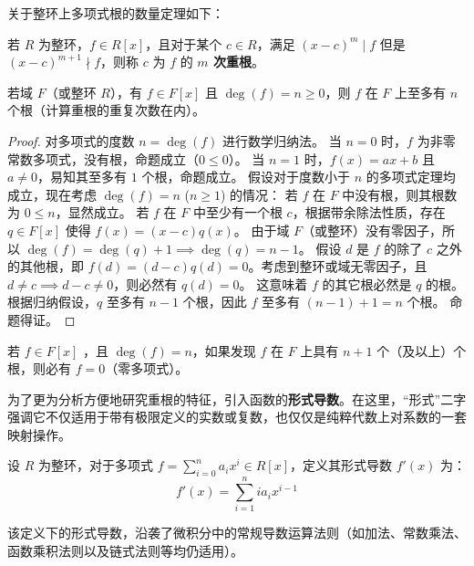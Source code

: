 \documentclass[11pt]{article}
\begin{document}
关于整环上多项式根的数量定理如下：
\begin{cndefinition}[重根]
若 $R$ 为整环，$f \in R[x]$，且对于某个 $c \in R$，满足 $(x-c)^m \mid f$ 但是 $(x-c)^{m+1} \nmid f$，则称 $c$ 为 $f$ 的 \textbf{$m$ 次重根}。
\end{cndefinition}

\begin{cntheorem}[代数基本定理的推论]
若域 $F$（或整环 $R$），有 $f \in F[x]$ 且 $\deg(f) = n \ge 0$，则 $f$ 在 $F$ 上至多有 $n$ 个根（计算重根的重复次数在内）。
\end{cntheorem}
\begin{proof}
对多项式的度数 $n = \deg(f)$ 进行数学归纳法。
当 $n = 0$ 时，$f$ 为非零常数多项式，没有根，命题成立（$0 \le 0$）。
当 $n = 1$ 时，$f(x) = ax+b$ 且 $a \neq 0$，易知其至多有 $1$ 个根，命题成立。
假设对于度数小于 $n$ 的多项式定理均成立，现在考虑 $\deg(f) = n$ ($n \ge 1$) 的情况：
若 $f$ 在 $F$ 中没有根，则其根数为 $0 \le n$，显然成立。
若 $f$ 在 $F$ 中至少有一个根 $c$，根据带余除法性质，存在 $q \in F[x]$ 使得 $f(x) = (x-c)q(x)$。
由于域 $F$（或整环）没有零因子，所以 $\deg(f) = \deg(q) + 1 \implies \deg(q) = n-1$。
假设 $d$ 是 $f$ 的除了 $c$ 之外的其他根，即 $f(d) = (d-c)q(d) = 0$。考虑到整环或域无零因子，且 $d \neq c \implies d-c \neq 0$，则必然有 $q(d) = 0$。
这意味着 $f$ 的其它根必然是 $q$ 的根。根据归纳假设，$q$ 至多有 $n-1$ 个根，因此 $f$ 至多有 $(n-1) + 1 = n$ 个根。
命题得证。
\end{proof}

\begin{cncorollary}
若 $f \in F[x]$ ，且 $\deg(f) = n$，如果发现 $f$ 在 $F$ 上具有 $n+1$ 个（及以上）个根，则必有 $f=0$（零多项式）。
\end{cncorollary}

为了更为分析方便地研究重根的特征，引入函数的\textbf{形式导数}。在这里，“形式”二字强调它不仅适用于带有极限定义的实数或复数，也仅仅是纯粹代数上对系数的一套映射操作。
\begin{cndefinition}[多项式的形式导数]
设 $R$ 为整环，对于多项式 $f = \sum_{i=0}^n a_i x^i \in R[x]$，定义其形式导数 $f'(x)$ 为：
$$ f'(x) = \sum_{i=1}^n i a_i x^{i-1} $$
\end{cndefinition}

\begin{cnproperty}[微商的运算法则]
该定义下的形式导数，沿袭了微积分中的常规导数运算法则（如加法、常数乘法、函数乘积法则以及链式法则等均仍适用）。
\end{cnproperty}
\end{document}

